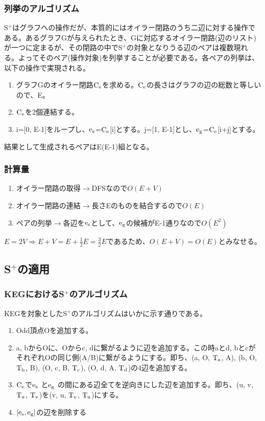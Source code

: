 \documentclass[11pt,a4j]{jarticle}
\newcommand{\splus}{S${}^\text{+}$}
\newcommand{\fl}[1]{$\rm{#1}$}
\begin{document}
\subsubsection{列挙のアルゴリズム}
\splus はグラフへの操作だが、本質的にはオイラー閉路のうち二辺に対する操作である。あるグラフGが与えられたとき、Gに対応するオイラー閉路(辺のリスト)が一つに定まるが、その閉路の中で\splus の対象となりうる辺のペアは複数現れる。よってそのペア(操作対象)を列挙することが必要である。各ペアの列挙は、以下の操作で実現される。

\begin{enumerate}
    \item グラフGのオイラー閉路\fl{C_e}を求める。\fl{C_e}の長さはグラフの辺の総数と等しいので、E。
    \item \fl{C_e}を2個連結する。
    \item i=[0, E-1]をループし、\fl{e_s}=\fl{C_e}[i]とする。j=[1, E-1]とし、\fl{e_g}=\fl{C_e}[i+j]とする。
\end{enumerate}

結果として生成されるペアはE(E-1)組となる。

\subsubsection{計算量}
\begin{enumerate}
    \item オイラー閉路の取得$\rightarrow$DFSなので$O(E+V)$
    \item オイラー閉路の連結$\rightarrow$長さEのものを結合するので$O(E)$
    \item ペアの列挙$\rightarrow$各辺を\fl{e_s}として、\fl{e_g}の候補がE-1通りなので$O(E^2)$
\end{enumerate}
$E=2V \Rightarrow E+V=E+\frac{1}{2}E=\frac{3}{2}E$であるため、$O(E+V)=O(E)$とみなせる。

\subsection{\splus の適用}

\subsubsection{KEGにおける\splus のアルゴリズム}
KEGを対象とした\splus のアルゴリズムはいかに示す通りである。
\begin{enumerate}
    \item Odd頂点Oを追加する。
    \item a, bからOに、Oからc, dに繋がるように辺を追加する。この時aとd, bとcがそれぞれOの同じ側(A/B)に繋がるようにする。即ち、(a, O, \fl{T_a}, A), (b, O, \fl{T_b}, B), (O, c, B, \fl{T_c}), (O, d, A, \fl{T_d})の4辺を追加する。
    \item \fl{C_e}で\fl{e_s} と\fl{e_g} の間にある辺全てを逆向きにした辺を追加する。即ち、(u, v, \fl{T_u}, \fl{T_v})を(v, u, \fl{T_v}, \fl{T_u})にする。
    \item $[\rm{e_s}, \rm{e_g}]$の辺を削除する
\end{enumerate}
\end{document}
